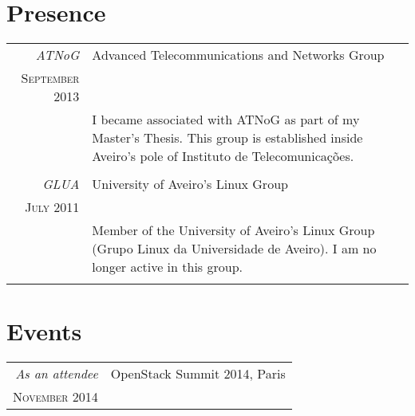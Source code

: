 \documentclass[a4paper,10pt]{article} %
\begin{document}
\section{Presence}
\begin{tabular}{r|p{11cm}}
	\emph{ATNoG} & Advanced Telecommunications and Networks Group \\
	\textsc{September 2013} & \\ 
	& \footnotesize{I became associated with ATNoG as part of my Master's Thesis. This group is established inside Aveiro's pole of Instituto de Telecomunicações.}\\
	\multicolumn{2}{c}{} \\
	\emph{GLUA} & University of Aveiro's Linux Group \\
	\textsc{July 2011} & \\ 
	& \footnotesize{Member of the University of Aveiro's Linux Group (Grupo Linux da Universidade de Aveiro). I am no longer active in this group.}\\
	\multicolumn{2}{c}{}\\
\end{tabular}


\section{Events}
\begin{tabular}{r|p{11cm}}
	\emph{As an attendee} & OpenStack Summit 2014, Paris \\
	\textsc{November 2014} & \\ 
\end{tabular} \\
\end{document}
